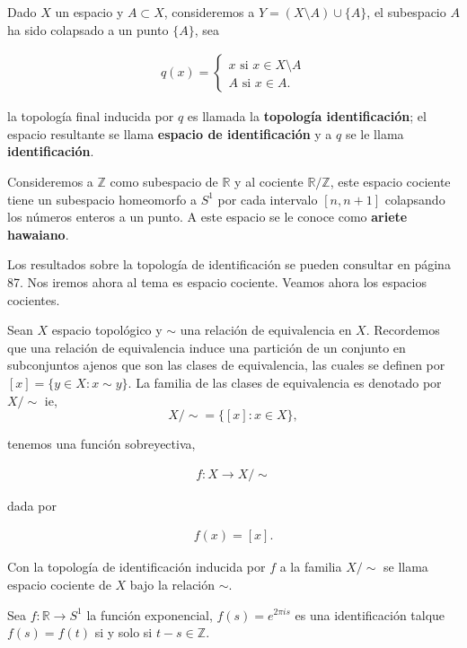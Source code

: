 Dado $X$ un espacio y $A \subset X$, consideremos a $Y=(X\setminus A) \cup \{A\}$, el subespacio $A$ ha sido colapsado a un punto $\{A\}$, sea

\begin{align*}
q(x)= \begin{cases}
x \text{ si } x \in X\setminus A \\
A \text{ si } x \in A.
\end{cases}
\end{align*}

la topología final inducida por $q$ es llamada la \textbf{topología identificación}; el espacio resultante se llama \textbf{espacio de identificación} y a $q$ se le llama \textbf{identificación}. 

\begin{ej}
Consideremos a $\mathbb{Z}$ como subespacio de $\mathbb{R}$ y al cociente $\mathbb{R}/\mathbb{Z}$, este espacio cociente tiene un subespacio homeomorfo a $S^1$ por cada intervalo $[n,n+1]$ colapsando los números enteros a un punto. A este espacio se le conoce como \textbf{ariete hawaiano}.
\end{ej}

Los resultados sobre la topología de identificación se pueden consultar en \cite{top_prieto} página 87. Nos iremos ahora al tema es espacio cociente. Veamos ahora los espacios cocientes.

Sean $X$ espacio topológico y $\sim$ una relación de equivalencia en $X$. Recordemos que una relación de equivalencia induce una partición de un conjunto en subconjuntos ajenos que son las clases de equivalencia, las cuales se definen por $[x]=\{y \in X : x \sim y\}$. La familia de las clases de equivalencia es denotado por $X/ \sim$ ie, $$X/ \sim=\{[x]: x \in X\},$$  

tenemos una función sobreyectiva,

\begin{align*}
f:X \to X / \sim
\end{align*}

dada por

\begin{align*}
f(x)=[x].
\end{align*}

\begin{df}
Con la topología de identificación inducida por $f$ a la familia $X/ \sim$ se llama espacio cociente de $X$ bajo la relación $\sim$. 
\end{df}

\begin{ej}
Sea $f: \mathbb{R} \to S^1$ la función exponencial, $f(s)=e^{2\pi i s}$ es una identificación talque $f(s)=f(t)$ si y solo si $t-s \in \mathbb{Z}$.
\end{ej}

